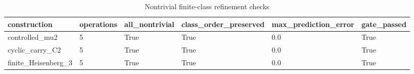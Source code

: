 \begin{table}[t]
\centering
\caption{Nontrivial finite-class refinement checks}
\begin{tabular}{llllll}
\toprule
construction & operations & all\_nontrivial & class\_order\_preserved & max\_prediction\_error & gate\_passed \\
\midrule
controlled\_mu2 & 5 & True & True & 0.0 & True \\
cyclic\_carry\_C2 & 5 & True & True & 0.0 & True \\
finite\_Heisenberg\_3 & 5 & True & True & 0.0 & True \\
\bottomrule
\end{tabular}
\end{table}
